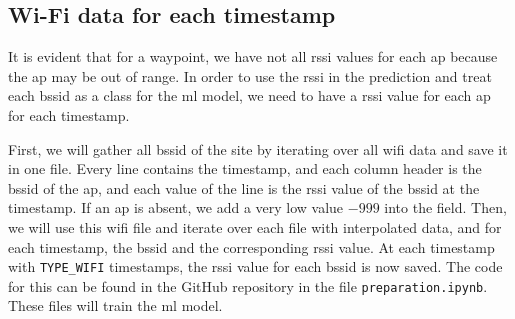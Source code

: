 \subsection{Wi-Fi data for each timestamp}\label{sec:wifi-data}
It is evident that for a waypoint, we have not all \ac{rssi} values for each \ac{ap} because the \ac{ap} may be out of range.
In order to use the \ac{rssi} in the prediction and treat each \ac{bssid} as a class for the \ac{ml} model, we need to have a \ac{rssi} value for each \ac{ap} for each timestamp.

First, we will gather all \ac{bssid} of the site by iterating over all \ac{wifi} data and save it in one file.
Every line contains the timestamp, and each column header is the \ac{bssid} of the \ac{ap}, and each value of the line is the \ac{rssi} value of the \ac{bssid} at the timestamp.
If an \ac{ap} is absent, we add a very low value \(-999\) into the field. 
Then, we will use this \ac{wifi} file and iterate over each file with interpolated data, and for each timestamp, the \ac{bssid} and the corresponding \ac{rssi} value.
At each timestamp with \texttt{TYPE\_WIFI} timestamps, the \ac{rssi} value for each \ac{bssid} is now saved.
The code for this can be found in the GitHub repository \cite{github-repo} in the file \texttt{preparation.ipynb}.
These files will train the \ac{ml} model.
